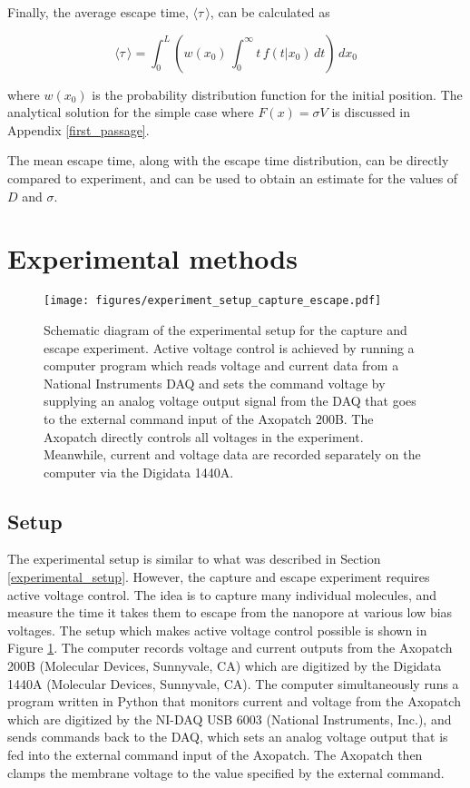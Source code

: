 Finally, the average escape time, $\langle \tau \, \rangle$, can be calculated as

\begin{equation}
\langle \tau \, \rangle = \int_0^L \left( w(x_0) \, \int_0^{\infty} t \, f(t|x_0) \, dt \right) \, dx_0
\label{eqn:mean_escape_time}
\end{equation}

\noindent
where $w(x_0)$ is the probability distribution function for the initial position.  The analytical solution for the simple case where $F(x) = \sigma V$ is discussed in Appendix \ref{first_passage}.

The mean escape time, along with the escape time distribution, can be directly compared to experiment, and can be used to obtain an estimate for the values of $D$ and $\sigma$.

\section{Experimental methods}

\begin{figure}[h]
\begin{centering}
\texttt{[image: figures/experiment\_setup\_capture\_escape.pdf]}
\caption[Experimental setup for capture and escape]{Schematic diagram of the experimental setup for the capture and escape experiment.  Active voltage control is achieved by running a computer program which reads voltage and current data from a National Instruments DAQ and sets the command voltage by supplying an analog voltage output signal from the DAQ that goes to the external command input of the Axopatch 200B.  The Axopatch directly controls all voltages in the experiment.  Meanwhile, current and voltage data are recorded separately on the computer via the Digidata 1440A.}
\label{fig:setup_capture}
\end{centering}
\end{figure}

\subsection{Setup}

The experimental setup is similar to what was described in Section \ref{experimental_setup}.  However, the capture and escape experiment requires active voltage control.  The idea is to capture many individual molecules, and measure the time it takes them to escape from the nanopore at various low bias voltages.  The setup which makes active voltage control possible is shown in Figure \ref{fig:setup_capture}.  The computer records voltage and current outputs from the Axopatch 200B (Molecular Devices, Sunnyvale, CA) which are digitized by the Digidata 1440A (Molecular Devices, Sunnyvale, CA).  The computer simultaneously runs a program written in Python that monitors current and voltage from the Axopatch which are digitized by the NI-DAQ USB 6003 (National Instruments, Inc.), and sends commands back to the DAQ, which sets an analog voltage output that is fed into the external command input of the Axopatch.  The Axopatch then clamps the membrane voltage to the value specified by the external command.

